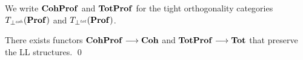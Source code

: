 We write \( \mathbf{CohProf} \) and \( \mathbf{TotProf} \) for the tight orthogonality categories \( T_{\mathrel{\bot}^{\mathit{coh}}}(\mathbf{Prof}) \) and \( T_{\mathrel{\bot}^{\mathit{tot}}}(\mathbf{Prof}) \).

\newcommand{\Coh}{\mathbf{Coh}}
\newcommand{\Tot}{\mathbf{Tot}}
\begin{proposition}
    There exists functors \( \CohProf \longrightarrow \Coh \) and \( \TotProf \longrightarrow \Tot \) that preserve the LL structures.
    \qed
\end{proposition}
